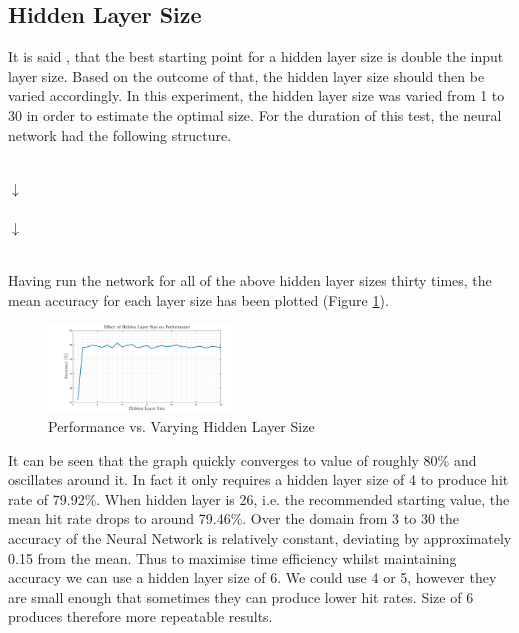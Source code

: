 \documentclass[10pt,twocolumn,letterpaper]{article}
\begin{document}
\subsection{Hidden Layer Size}
It is said \cite{NN_Java}, that the best starting point for a hidden layer size is double the input layer size. Based on the outcome of that, the hidden layer size should then be varied accordingly. In this experiment, the hidden layer size was varied from 1 to 30 in order to estimate the optimal size. For the duration of this test, the neural network had the following structure.

\begin{center}
 \\

\centering
$\downarrow$ \\

\centering
{}\\

\centering
$\downarrow$\\

\centering
{}\\

\end{center}

Having run the network for all of the above hidden layer sizes thirty times, the mean accuracy for each layer size has been plotted (Figure \ref{fig:HidSiz}).

\begin{figure}[H]
\centering
\includegraphics[width=0.45\textwidth]{../results/NN_HiddenLayer}
\caption{Performance vs. Varying Hidden Layer Size
\label{fig:HidSiz}}
\end{figure}

It can be seen that the graph quickly converges to value of roughly 80\% and oscillates around it. In fact it only requires a hidden layer size of 4 to produce hit rate of 79.92\%. When hidden layer is 26, i.e. the recommended starting value, the mean hit rate drops to around 79.46\%. Over the domain from 3 to 30 the accuracy of the Neural Network is relatively constant, deviating by approximately 0.15 from the mean. Thus to maximise time efficiency whilst maintaining accuracy we can use a hidden layer size of 6. We could use 4 or 5, however they are small enough that sometimes they can produce lower hit rates. Size of 6 produces therefore more repeatable results.
\end{document}
